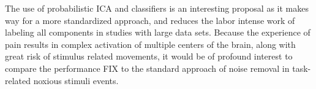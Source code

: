 The use of probabilistic ICA and classifiers is an interesting proposal as it makes way for a more standardized approach, and reduces the labor intense work of labeling all components in studies with large data sets. Because the experience of pain results in complex activation of multiple centers of the brain, along with great risk of stimulus related movements, it would be of profound interest to compare the performance FIX to the standard approach of noise removal in task-related noxious stimuli events.     
